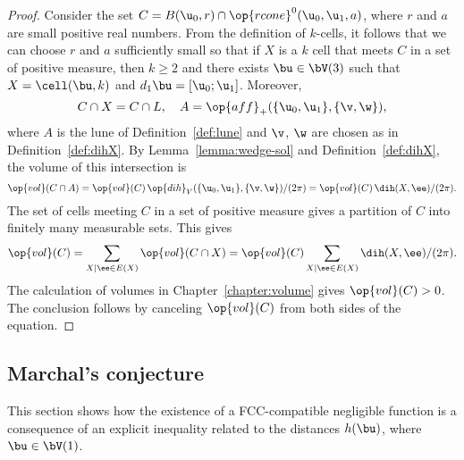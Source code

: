 \begin{proof} 
  Consider the set $C=B(\u_0,r)\cap \op{rcone}^0(\u_0,\u_1,a)$, where
  $r$ and $a$ are small positive real numbers.  From the definition of
  $k$-cells, it follows that we can choose $r$ and $a$ sufficiently
  small so that if $X$ is a $k$ cell that meets $C$ in a set of
  positive measure, then $k\ge 2$ and there exists $\bu\in \bV(3)$
  such that $X=\cell(\bu,k)$ and $d_1\bu=[\u_0;\u_1]$.  Moreover,
\[
C\cap X = C\cap L, \quad A=\op{aff}_+(\{\u_0,\u_1\},\{\v,\w\}),
\]
where $A$ is the lune of Definition~\ref{def:lune} and $\v$, $\w$ are
chosen as in Definition~\ref{def:dihX}.  By
Lemma~\ref{lemma:wedge-sol} and Definition~\ref{def:dihX}, the volume
of this intersection is
\[
\op{vol}(C\cap A) = \op{vol}(C)\,
 {\op{dih}_V(\{\u_0,\u_1\},\{\v,\w\}) }/{(2\pi)} =
  \op{vol}(C)\, {\dih(X,\ee)}/{(2\pi)}.
\]
The set of cells meeting $C$ in a set of positive measure gives a 
partition of $C$ into finitely many measurable sets.
This gives
\[
\op{vol}(C) = \sum_{X\mid \ee\in E(X)} \op{vol}(C\cap X)  = 
\op{vol}(C)\sum_{X\mid \ee\in E(X)} \dih(X,\ee)/(2\pi).
\]
The calculation of volumes in Chapter~\ref{chapter:volume} gives
$\op{vol}(C)>0$.  The conclusion follows by canceling $\op{vol}(C)$
from both sides of the equation.
\end{proof}







\subsection{Marchal's conjecture}

This section shows how the existence of a FCC-compatible negligible
function is a consequence of an explicit
inequality related to the distances $h(\bu)$, where $\bu\in \bV(1)$.

